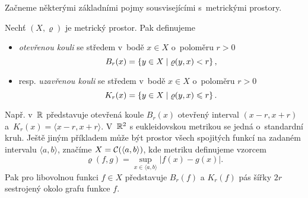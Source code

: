 Začneme některými základními pojmy sousvisejícími s~metrickými prostory.
\begin{definition}\label{def:koule-mp}
    Nechť $(X,\varrho)$ je metrický prostor. Pak definujeme
    \begin{itemize}
        \item \emph{otevřenou kouli} se středem v~bodě $x\in X$ o~poloměru $r>0$
        \[B_r(x)=\left\{y\in X\mid\varrho(y,x)<r\right\},\]
        \item resp. \emph{uzavřenou kouli} se středem v~bodě $x\in X$ o~poloměru $r>0$
        \[K_r(x)=\left\{y\in X\mid\varrho(y,x)\leqslant r\right\}.\]
    \end{itemize}
\end{definition}
Např. v~$\mathbb{R}$ představuje otevřená koule $B_r(x)$ otevřený interval $(x-r,x+r)$ a~$K_r(x)=\langle x-r,x+r\rangle$. V~$\mathbb{R}^2$ s eukleidovskou metrikou se jedná o~standardní kruh. Ještě jiným příkladem může být prostor všech spojitých funkcí na zadaném intervalu $\langle a,b\rangle$, značíme $X=\mathcal{C}(\langle a,b\rangle)$, kde metriku definujeme vzorcem
\[\varrho(f,g)=\sup_{x\in\langle a,b\rangle}|f(x)-g(x)|.\]
Pak pro libovolnou funkci $f\in X$ představuje $B_r(f)$ a $K_r(f)$ pás šířky $2r$ sestrojený okolo grafu funkce $f$.

